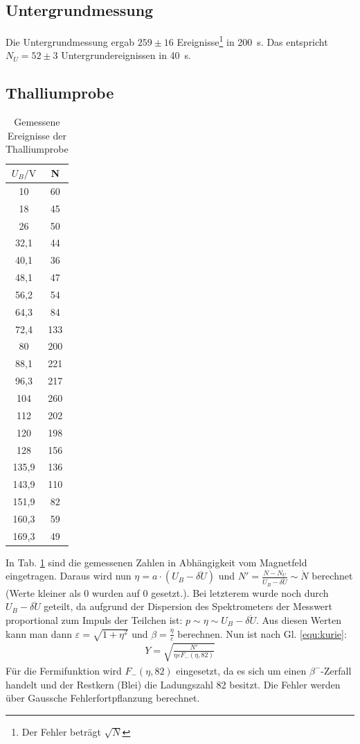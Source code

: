 \subsection{Untergrundmessung}

Die Untergrundmessung ergab $259\pm 16$ Ereignisse\footnote{Der Fehler beträgt $\sqrt{N}$} in \SI{200}{\second}. Das entspricht $N_U = 52 \pm 3$ Untergrundereignissen in \SI{40}{\second}.
 

\subsection{Thalliumprobe}
\begin{table}
\centering
\caption{Gemessene Ereignisse der Thalliumprobe}
\begin{tabular}{cc}
\toprule
$U_B/\si{\volt}$ & N\\
\midrule
10&	60\\
18&	45\\
26&	50\\
32,1&	44\\
40,1&	36\\
48,1&	47\\
56,2&	54\\
64,3&	84\\
72,4&	133\\
80&	200\\
88,1&	221\\
96,3&	217\\
104&	260\\
112&	202\\
120&	198\\
128&	156\\
135,9&	136\\
143,9&	110\\
151,9&	82\\
160,3&	59\\
169,3&	49\\
\bottomrule
\end{tabular}
\label{tab:tl}
\end{table}

In Tab. \ref{tab:tl} sind die gemessenen Zahlen in Abhängigkeit vom Magnetfeld eingetragen. Daraus wird nun $\eta = a\cdot (U_B - \overline{\delta U})$ und $N' = \frac{N - N_U}{U_B - \overline{\delta U}} \sim \dot{N}$ berechnet (Werte kleiner als 0 wurden auf 0 gesetzt.). Bei letzterem wurde noch durch $U_B - \overline{\delta U}$ geteilt, da aufgrund der Dispersion des Spektrometers der Messwert proportional zum Impuls  der Teilchen ist: $p \sim \eta \sim U_B - \overline{\delta U}$. Aus diesen Werten kann man dann $\varepsilon = \sqrt{1 + \eta^2}$ und $\beta = \frac{\eta}{\varepsilon}$ berechnen. Nun ist nach Gl. \ref{equ:kurie}:
\begin{align*}
Y = \sqrt{\frac{N'}{\eta\varepsilon F_{-}(\eta,82)}}
\end{align*}
Für die Fermifunktion wird $F_{-}(\eta,82)$ eingesetzt, da es sich um einen $\beta^-$-Zerfall handelt und der Restkern (Blei) die Ladungszahl 82 besitzt. Die Fehler werden über Gaussche Fehlerfortpflanzung berechnet.\\

